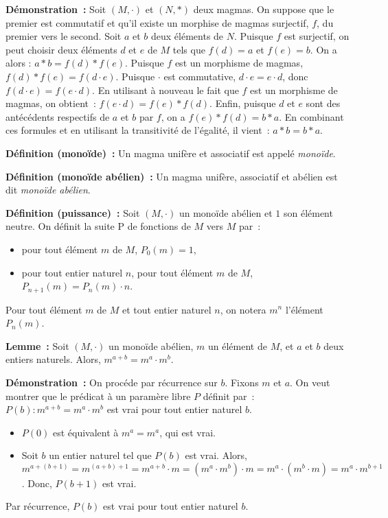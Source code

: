 \noindent\textbf{Démonstration :} Soit $(M,\cdot)$ et $(N,\ast)$ deux magmas. 
    On suppose que le premier est commutatif et qu'il existe un morphise de magmas surjectif, $f$, du premier vers le second. 
    Soit $a$ et $b$ deux éléments de $N$. 
    Puisque $f$ est surjectif, on peut choisir deux éléments $d$ et $e$ de $M$ tels que $f(d) = a$ et $f(e) = b$.
    On a alors : $a \ast b = f(d) \ast f(e)$.
    Puisque $f$ est un morphisme de magmas, $f(d) \ast f(e) = f(d \cdot e)$.
    Puisque $\cdot$ est commutative, $d \cdot e = e \cdot d$, donc $f(d \cdot e) = f(e \cdot d)$. 
    En utilisant à nouveau le fait que $f$ est un morphisme de magmas, on obtient : $f(e \cdot d) = f(e) \ast f(d)$. 
    Enfin, puisque $d$ et $e$ sont des antécédents respectifs de $a$ et $b$ par $f$, on a $f(e) \ast f(d) = b \ast a$. 
    En combinant ces formules et en utilisant la transitivité de l'égalité, il vient : $a \ast b = b \ast a$.

    \hfill \square

\medskip

\noindent\textbf{Définition (monoïde) :} Un magma unifère et associatif est appelé \textit{monoïde}.

\medskip

\noindent\textbf{Définition (monoïde abélien) :} Un magma unifère, associatif et abélien est dit \textit{monoïde abélien}.

\medskip

\noindent\textbf{Définition (puissance) :} Soit $(M,\cdot)$ un monoïde abélien et $1$ son élément neutre.
    On définit la suite $\mathrm{P}$ de fonctions de $M$ vers $M$ par : 
    \begin{itemize}[nosep]
        \item pour tout élément $m$ de $M$, $P_0(m) = 1$,
        \item pour tout entier naturel $n$, pour tout élément $m$ de $M$, $P_{n+1}(m) = P_n(m) \cdot n$.
    \end{itemize}
    Pour tout élément $m$ de $M$ et tout entier naturel $n$, on notera $m^n$ l'élément $P_n(m)$.

\medskip

\noindent\textbf{Lemme :} Soit $(M,\cdot)$ un monoïde abélien, $m$ un élément de $M$, et $a$ et $b$ deux entiers naturels. 
    Alors, $m^{a + b} = m^a \cdot m^b$.

\medskip

\noindent\textbf{Démonstration :} On procéde par récurrence sur $b$.
    Fixons $m$ et $a$.
    On veut montrer que le prédicat à un paramère libre $P$ définit par : $P(b): m^{a+b} = m^a \cdot m^b$ est vrai pour tout entier naturel $b$.
    \begin{itemize}[nosep]
        \item $P(0)$ est équivalent à $m^a = m^a$, qui est vrai.
        \item Soit $b$ un entier naturel tel que $P(b)$ est vrai. 
            Alors, $m^{a+(b+1)} = m^{(a+b)+1} = m^{a+b} \cdot m = (m^a \cdot m^b) \cdot m = m^a \cdot (m^b \cdot m) = m^a \cdot m^{b+1}$.
            Donc, $P(b+1)$ est vrai.
    \end{itemize}
    Par récurrence, $P(b)$ est vrai pour tout entier naturel $b$.

